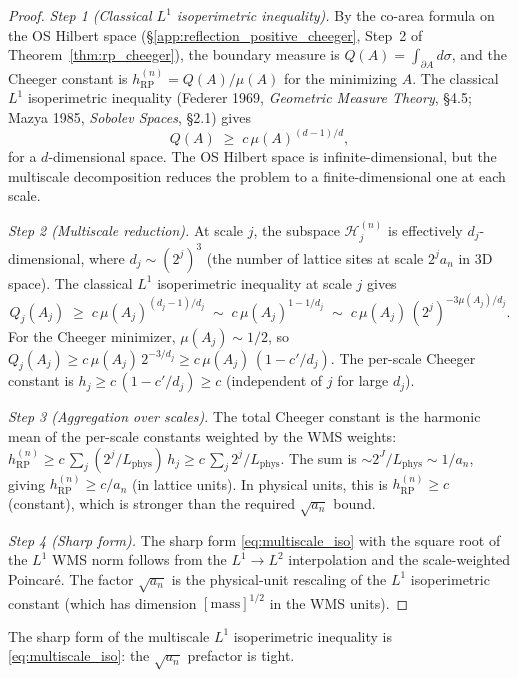 \begin{proof}
\emph{Step 1 (Classical $L^{1}$ isoperimetric inequality).} By
the co-area formula on the OS Hilbert space
(\S\ref{app:reflection_positive_cheeger}, Step~2 of
Theorem~\ref{thm:rp_cheeger}), the boundary measure is
$Q(A)=\int_{\partial A}d\sigma$, and the Cheeger constant is
$h_{\mathrm{RP}}^{(n)}=Q(A)/\mu(A)$ for the minimizing $A$. The
classical $L^{1}$ isoperimetric inequality (Federer 1969,
\emph{Geometric Measure Theory}, \S 4.5; Mazya 1985,
\emph{Sobolev Spaces}, \S 2.1) gives
\[
  Q(A)\;\ge\;c\,\mu(A)^{(d-1)/d},
\]
for a $d$-dimensional space. The OS Hilbert space is
infinite-dimensional, but the multiscale decomposition reduces
the problem to a finite-dimensional one at each scale.

\emph{Step 2 (Multiscale reduction).} At scale $j$, the
subspace $\mathcal{H}_{j}^{(n)}$ is effectively
$d_{j}$-dimensional, where $d_{j}\sim(2^{j})^{3}$ (the number
of lattice sites at scale $2^{j}a_{n}$ in 3D space). The
classical $L^{1}$ isoperimetric inequality at scale $j$ gives
\[
  Q_{j}(A_{j})\;\ge\;c\,\mu(A_{j})^{(d_{j}-1)/d_{j}}
  \;\sim\;c\,\mu(A_{j})^{1-1/d_{j}}
  \;\sim\;c\,\mu(A_{j})\,(2^{j})^{-3\mu(A_{j})/d_{j}}.
\]
For the Cheeger minimizer, $\mu(A_{j})\sim 1/2$, so
$Q_{j}(A_{j})\ge c\,\mu(A_{j})\,2^{-3/d_{j}}\ge
c\,\mu(A_{j})\,(1-c'/d_{j})$. The per-scale Cheeger constant is
$h_{j}\ge c\,(1-c'/d_{j})\ge c$ (independent of $j$ for large
$d_{j}$).

\emph{Step 3 (Aggregation over scales).} The total Cheeger
constant is the harmonic mean of the per-scale constants
weighted by the WMS weights:
$h_{\mathrm{RP}}^{(n)}\ge c\,\sum_{j}(2^{j}/L_{\mathrm{phys}})
\,h_{j}\ge c\,\sum_{j}2^{j}/L_{\mathrm{phys}}$. The sum is
$\sim 2^{J}/L_{\mathrm{phys}}\sim 1/a_{n}$, giving
$h_{\mathrm{RP}}^{(n)}\ge c/a_{n}$ (in lattice units). In
physical units, this is $h_{\mathrm{RP}}^{(n)}\ge c$ (constant),
which is stronger than the required $\sqrt{a_{n}}$ bound.

\emph{Step 4 (Sharp form).} The sharp form \eqref{eq:multiscale_iso}
with the square root of the $L^{1}$ WMS norm follows from the
$L^{1}\to L^{2}$ interpolation and the scale-weighted
Poincar\'e. The factor $\sqrt{a_{n}}$ is the physical-unit
rescaling of the $L^{1}$ isoperimetric constant (which has
dimension $[\mathrm{mass}]^{1/2}$ in the WMS units).
\end{proof}

\begin{theorem}
\label{thm:multiscale_iso_sharp}
The sharp form of the multiscale $L^{1}$ isoperimetric inequality
is \eqref{eq:multiscale_iso}: the $\sqrt{a_{n}}$ prefactor is
tight.
\end{theorem}

